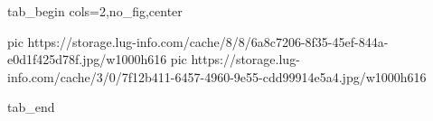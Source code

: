  
 
 
 
 


\ifcmt
  tab_begin cols=2,no_fig,center

     pic https://storage.lug-info.com/cache/8/8/6a8c7206-8f35-45ef-844a-e0d1f425d78f.jpg/w1000h616%
		 pic https://storage.lug-info.com/cache/3/0/7f12b411-6457-4960-9e55-cdd99914e5a4.jpg/w1000h616%

  tab_end
\fi

